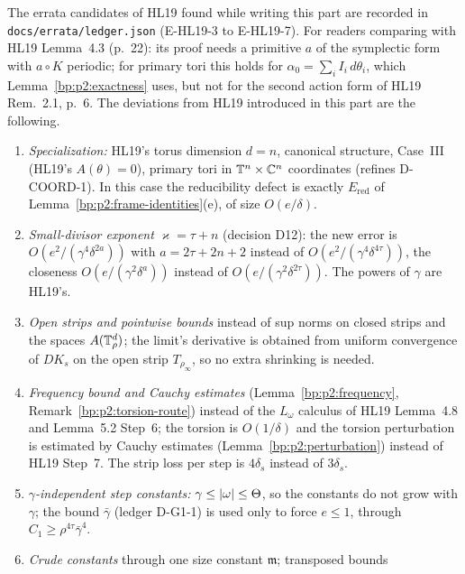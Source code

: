 \begin{remark}\label{bp:p2:deviations}
The errata candidates of HL19 found while writing this part are recorded in
\texttt{docs/errata/ledger.json} (E-HL19-3 to E-HL19-7). For readers comparing with HL19 Lemma~4.3
(p.~22): its proof needs a primitive $a$ of the symplectic form with $a\circ K$ periodic; for primary tori
this holds for $\alpha_0=\sum_iI_i\,d\theta_i$, which Lemma~\ref{bp:p2:exactness} uses, but not for the second
action form of HL19 Rem.~2.1, p.~6. The deviations from HL19 introduced in this part are the following.
\begin{enumerate}[label=(V\arabic*)]
\item\label{bp:p2:V1} \emph{Specialization:} HL19's torus dimension $d=n$, canonical structure,
  Case~III (HL19's $A(\theta)=0$), primary tori in $\mathbb{T}^n\times\mathbb{C}^n$ coordinates (refines D-COORD-1). In this case the reducibility defect is exactly
  $E_{\mathrm{red}}$ of Lemma~\ref{bp:p2:frame-identities}(e), of size $O(e/\delta)$.
\item\label{bp:p2:V2} \emph{Small-divisor exponent} $\varkappa=\tau+n$ (decision D12): the new error is
  $O(e^2/(\gamma^4\delta^{2a}))$ with $a=2\tau+2n+2$ instead of $O(e^2/(\gamma^4\delta^{4\tau}))$, the
  closeness $O(e/(\gamma^2\delta^a))$ instead of $O(e/(\gamma^2\delta^{2\tau}))$. The powers of $\gamma$
  are HL19's.
\item\label{bp:p2:V3} \emph{Open strips and pointwise bounds} instead of sup norms on closed strips and
  the spaces $A(\mathbb{T}^d_\rho)$; the limit's derivative is obtained from uniform convergence of $DK_s$ on the
  open strip $T_{\rho_\infty}$, so no extra shrinking is needed.
\item\label{bp:p2:V4} \emph{Frequency bound and Cauchy estimates} (Lemma~\ref{bp:p2:frequency},
  Remark~\ref{bp:p2:torsion-route}) instead of the $L_\omega$ calculus of HL19 Lemma~4.8 and Lemma~5.2
  Step~6; the torsion is $O(1/\delta)$ and the torsion perturbation is estimated by Cauchy estimates
  (Lemma~\ref{bp:p2:perturbation}) instead of HL19 Step~7. The strip loss per step is $4\delta_s$ instead
  of $3\delta_{s}$.
\item\label{bp:p2:V5} \emph{$\gamma$-independent step constants:} $\gamma\le\lvert \omega\rvert\le\Theta$, so the
  constants do not grow with $\gamma$; the bound $\bar\gamma$ (ledger D-G1-1) is used only to force
  $e\le1$, through $C_1\ge\rho^{4\tau}\bar\gamma^4$.
\item\label{bp:p2:V6} \emph{Crude constants} through one size constant $\mathfrak m$; transposed bounds

\end{enumerate}
\end{remark}

